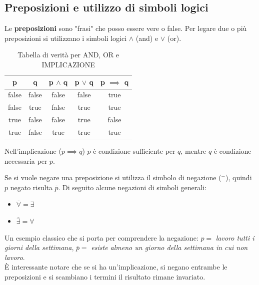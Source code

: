 \subsection{Preposizioni e utilizzo di simboli logici}

Le \textbf{preposizioni} sono "frasi" che posso essere vere o false. Per legare due o più preposizioni si utilizzano i simboli logici $\land$ (and) e $\lor$ (or). %

\begin{table}[H]
\centering
\begin{tabular}{|cc|c|c|c|}
\hline
p & q & \multicolumn{1}{l|}{p $\land$ q} & \multicolumn{1}{l|}{p $\lor$ q} & \multicolumn{1}{l|}{p $\implies$ q} \\ \hline
{\color[HTML]{000000} false} & {\color[HTML]{000000} false} & false & false & true \\
{\color[HTML]{000000} false} & {\color[HTML]{000000} true} & false & true & true \\
{\color[HTML]{000000} true} & {\color[HTML]{000000} false} & false & true & false \\
true & false & true & true & true \\ \hline
\end{tabular}

\caption{Tabella di verità per AND, OR e IMPLICAZIONE}
\end{table}

Nell'implicazione ($p \implies q$) $p$ è condizione sufficiente per $q$, mentre $q$ è condizione necessaria per $p$.

Se si vuole negare una preposizione si utilizza il simbolo di negazione ($^-$), quindi $p$ negato risulta $\overline{p}$. Di seguito alcune negazioni di simboli generali:
\begin{itemize}
    \item $\overline{\forall} = \exists$
    \item $\overline{\exists} = \forall$
\end{itemize}
Un esempio classico che si porta per comprendere la negazione: $p = $ \textit{lavoro tutti i giorni della settimana}, $\overline{p} =$ \textit{esiste almeno un giorno della settimana in cui non lavoro}.\\

È interessante notare che se si ha un'implicazione, si negano entrambe le preposizioni e si scambiano i termini il risultato rimane invariato.

